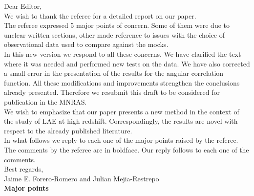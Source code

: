 \documentclass[12pts]{article}
\begin{document}
Dear Editor, \\

We wish to thank the referee for a detailed report on our paper. \\

The referee expressed 5 major points of concern. Some of them were due
to unclear written sections, other made reference to issues with the
choice of observational data used to compare against the mocks.\\ 

In this new version we respond to all these concerns. We have
clarified the text where it was needed and performed new tests on the
data. We have also corrected a small error in the presentation of the
results for the angular correlation function. All these modifications
and improvements strengthen the conclusions already
presented. Therefore we resubmit this draft to be considered for
publication in the MNRAS.\\   

We wish to emphasize that our paper presents a new method in the context
of the study of LAE at high redshift. Correspondingly, the results are
novel with respect to the already published literature.\\

In what follows we reply to each one of the major points raised by the
referee. The comments by the referee are in boldface. Our reply
follows to each one of the comments.\\


Best regards,\\

Jaime E. Forero-Romero and Julian Mejia-Restrepo\\


{\large \bf Major points}\\
\end{document}

